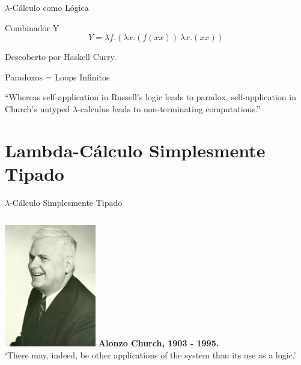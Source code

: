 \documentclass{beamer}
\begin{document}

\begin{frame}{$\lambda$-Cálculo como Lógica}

\begin{block}{Combinador Y}
\vskip2mm
\begin{equation}
Y = \lambda f.(\lambda x.(f (x x))~\lambda x.(x x))
\end{equation}
\vskip2mm

Descoberto por Haskell Curry.

\end{block}

\end{frame}


\begin{frame}{Paradoxos = Loops Infinitos}

\begin{exampleblock}{}
\justify
  {\large ``Whereas self-application in Russell’s logic leads to paradox, self-application in Church’s untyped $\lambda$-calculus leads to non-terminating computations.''}
  \vskip5mm
  \hspace*{}
\end{exampleblock}

\end{frame}

\section{Lambda-Cálculo Simplesmente Tipado}

\begin{frame}{$\lambda$-Cálculo Simplesmente Tipado}

\begin{columns}
\centering
\includegraphics[width=4cm]{church.jpg}
\textbf{Alonzo Church, 1903 - 1995.}\\
\justifying
‘There may, indeed, be other applications of the system than its use as a logic.’
\end{columns} 

\end{frame}
\end{document}
